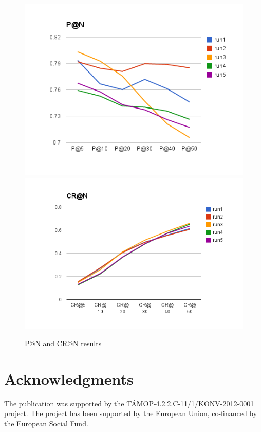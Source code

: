 \documentclass{acm_proc_article-me}
\begin{document}
\begin{figure}[h]
\centering
\includegraphics[width=0.8\linewidth]{p}
\includegraphics[width=0.8\linewidth]{cr}
\caption{P@N and CR@N results}
\label{fig:p}
\end{figure}



\section{Acknowledgments}

The publication was supported by the T\'AMOP-4.2.2.C-11/1/KONV-2012-0001 project. The project has been supported by the European Union, co-financed by the European Social Fund.



\end{document}

